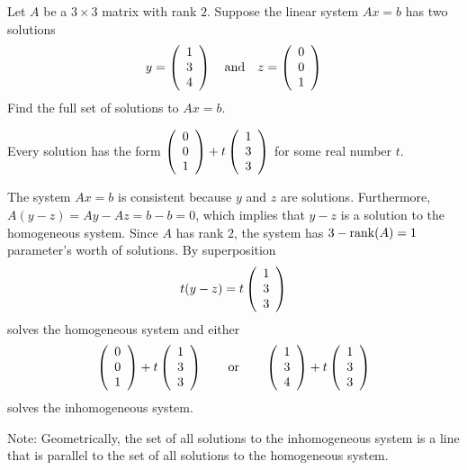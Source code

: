 \documentclass{ximera}
\author{Marty Golubitsky}
\begin{document}
\begin{exercise}\label{A.3.4.2}

Let $A$ be a $3\times 3$ matrix with rank $2$.  Suppose the linear system $Ax=b$ has two solutions
\[
y = \left(\begin{array}{rrrrrrrrrrrrrrrrrr} 1 \\3 \\4 \end{array}\right) \quad\mbox{and}\quad z = \left(\begin{array}{rrrrrrrrrrrrrrrrrr} 0\\ 0 \\ 1 \end{array}\right)
\]
Find the full set of solutions to $Ax = b$. 
  
\begin{solution}

\ans Every solution has the form $\left(\begin{array}{rrrrrrrrrrrrrrrrrr} 0\\0\\1 \end{array}\right) + t \left(\begin{array}{rrrrrrrrrrrrrrrrrr} 1\\3\\3 \end{array}\right)$ for some real number $t$. 

\soln The system $Ax=b$ is consistent because $y$ and $z$ are solutions.  Furthermore, $A(y-z)=Ay-Az=b-b=0$, which implies that $y-z$ is a solution to the homogeneous system.  Since $A$ has rank $2$, the system has $3 -{\rm rank}(A) = 1$ parameter's worth of solutions.  By superposition 
\[
t(y - z) = t \left(\begin{array}{rrrrrrrrrrrrrrrrrr} 1\\3\\3 \end{array}\right)
\]
solves the homogeneous system and either 
\[
\left(\begin{array}{rrrrrrrrrrrrrrrrrr} 0\\0\\1 \end{array}\right) + t \left(\begin{array}{rrrrrrrrrrrrrrrrrr} 1\\3\\3 \end{array}\right)\qquad \text{or} \qquad
\left(\begin{array}{rrrrrrrrrrrrrrrrrr} 1\\3\\4 \end{array}\right) + t \left(\begin{array}{rrrrrrrrrrrrrrrrrr} 1\\3\\3 \end{array}\right)
\]
solves the inhomogeneous system.

Note: Geometrically, the set of all solutions to the inhomogeneous system is a line that is parallel to the set of all solutions to the homogeneous system. 
\end{solution}
\end{exercise}
\end{document}
